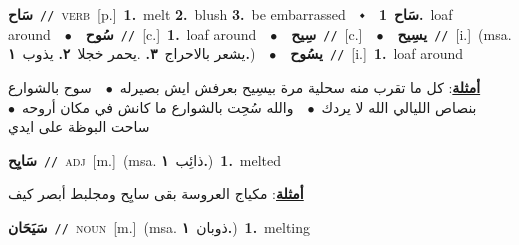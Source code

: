 \documentclass[10pt,a4paper,twoside]{article} %
\begin{document}
\begin{multicols}{2}
{\setlength\topsep{0pt}\textbf{\foreignlanguage{arabic}{سَاح}}\ {\color{gray}\texttt{//}\color{black}}\ \textsc{verb}\ [p.]\ \textbf{1.}~melt  \textbf{2.}~blush  \textbf{3.}~be embarrassed\ \ $\smblkdiamond$\ \ \setlength\topsep{0pt}\textbf{\foreignlanguage{arabic}{سَاح}}\ \textbf{1.}~loaf around\ \ $\bullet$\ \ \setlength\topsep{0pt}\textbf{\foreignlanguage{arabic}{سُوح}}\ {\color{gray}\texttt{//}\color{black}}\ [c.]\ \textbf{1.}~loaf around\ \ $\bullet$\ \ \setlength\topsep{0pt}\textbf{\foreignlanguage{arabic}{سِيح}}\ {\color{gray}\texttt{//}\color{black}}\ [c.]\ \ $\bullet$\ \ \setlength\topsep{0pt}\textbf{\foreignlanguage{arabic}{يسِيح}}\ {\color{gray}\texttt{//}\color{black}}\ [i.]\ \color{gray}(msa. \foreignlanguage{arabic}{يشعر بالاحراج}~\foreignlanguage{arabic}{\textbf{٣.}}  .\foreignlanguage{arabic}{يحمر خجلا}~\foreignlanguage{arabic}{\textbf{٢.}}  \foreignlanguage{arabic}{يذوب}~\foreignlanguage{arabic}{\textbf{١.}})\color{black}\ \ $\bullet$\ \ \setlength\topsep{0pt}\textbf{\foreignlanguage{arabic}{يسُوح}}\ {\color{gray}\texttt{//}\color{black}}\ [i.]\ \textbf{1.}~loaf around\  \begin{flushright}\color{gray}\foreignlanguage{arabic}{\textbf{\underline{\foreignlanguage{arabic}{أمثلة}}}: كل ما تقرب منه سحلية مرة بيسِيح بعرفش ايش بصيرله\ $\bullet$\ \  سوح بالشوارع بنصاص الليالي الله لا يردك\ $\bullet$\ \  والله سُحِت بالشوارع  ما كانش في مكان أروحه\ $\bullet$\ \  ساحت البوظة على ايدي}\end{flushright}\color{black}} \vspace{2mm}

{\setlength\topsep{0pt}\textbf{\foreignlanguage{arabic}{سَايِح}}\ {\color{gray}\texttt{//}\color{black}}\ \textsc{adj}\ [m.]\ \color{gray}(msa. \foreignlanguage{arabic}{ذائِب}~\foreignlanguage{arabic}{\textbf{١.}})\color{black}\ \textbf{1.}~melted\  \begin{flushright}\color{gray}\foreignlanguage{arabic}{\textbf{\underline{\foreignlanguage{arabic}{أمثلة}}}: مكياج العروسة بقى سايِح ومجلبط أبصر كيف}\end{flushright}\color{black}} \vspace{2mm}

{\setlength\topsep{0pt}\textbf{\foreignlanguage{arabic}{سَيَحَان}}\ {\color{gray}\texttt{//}\color{black}}\ \textsc{noun}\ [m.]\ \color{gray}(msa. \foreignlanguage{arabic}{ذوبان}~\foreignlanguage{arabic}{\textbf{١.}})\color{black}\ \textbf{1.}~melting\ } \vspace{2mm}


\end{multicols}
\end{document}
